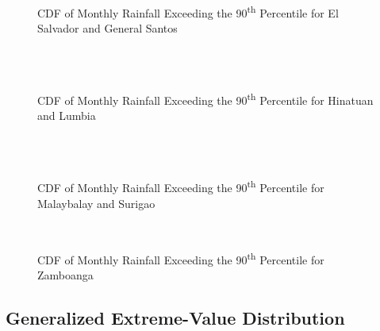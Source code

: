 \begin{figure}[H]
  \centering
  \\
  \\
  \caption{CDF of Monthly Rainfall Exceeding the 90\textsuperscript{th} Percentile for El Salvador and General Santos}
  \label{fig:monthly_0.90_appendix_gpd_pt3}
\end{figure}

\begin{figure}[H]
  \centering
  \\
  \\
\caption{CDF of Monthly Rainfall Exceeding the 90\textsuperscript{th} Percentile for Hinatuan and Lumbia}
  \label{fig:monthly_0.90_appendix_gpd_pt4}
\end{figure}

\begin{figure}[H]
  \centering
  \\
  \\
  \caption{CDF of Monthly Rainfall Exceeding the 90\textsuperscript{th} Percentile for Malaybalay and Surigao}
  \label{fig:monthly_0.90_appendix_gpd_pt5}
\end{figure}

\begin{figure}[H]
  \centering
  \\
  \caption{CDF of Monthly Rainfall Exceeding the 90\textsuperscript{th} Percentile for Zamboanga}
  \label{fig:monthly_0.90_appendix_gpd_pt6}
\end{figure}

\subsection{Generalized Extreme-Value Distribution}

